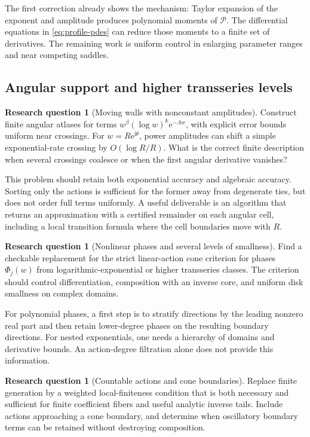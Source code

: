 \documentclass[11pt,a4paper]{article}
\numberwithin{equation}{section}
\theoremstyle{definition}
\newtheorem{question}[theorem]{Research question}
\theoremstyle{remark}
\newcommand{\ii}{\mathrm i}
\newcommand{\e}{\mathrm e}
\begin{document}
The first correction already shows the mechanism: Taylor expansion
of the exponent and amplitude produces polynomial moments of
$\mathcal P$. The differential equations in
\eqref{eq:profile-pdes} can reduce those moments to a finite set of
derivatives. The remaining work is uniform control in enlarging
parameter ranges and near competing saddles.

\subsection{Angular support and higher transseries levels}

\begin{question}[Moving walls with nonconstant amplitudes]
Construct finite angular atlases for terms
$w^\beta(\log w)^k\e^{-\Lambda w}$, with explicit error bounds
uniform near crossings. For $w=R\e^{\ii\theta}$, power amplitudes
can shift a simple exponential-rate crossing by
$O(\log R/R)$.
What is the correct finite description when several crossings
coalesce or when the first angular derivative vanishes?
\end{question}

This problem should retain both exponential accuracy and algebraic
accuracy. Sorting only the actions is sufficient for the former
away from degenerate ties, but does not order full terms uniformly.
A useful deliverable is an algorithm that returns an approximation
with a certified remainder on each angular cell, including a local
transition formula where the cell boundaries move with $R$.

\begin{question}[Nonlinear phases and several levels of smallness]
Find a checkable replacement for the strict linear-action cone
criterion for phases $\Phi_j(w)$ from logarithmic-exponential
or higher transseries classes.
The criterion should control differentiation, composition with
an inverse core, and uniform disk smallness on complex domains.
\end{question}

For polynomial phases, a first step is to stratify directions by
the leading nonzero real part and then retain lower-degree phases
on the resulting boundary directions. For nested exponentials,
one needs a hierarchy of domains and derivative bounds.
An action-degree filtration alone does not provide this information.

\begin{question}[Countable actions and cone boundaries]
Replace finite generation by a weighted local-finiteness condition
that is both necessary and sufficient for finite coefficient fibers
and useful analytic inverse tails. Include actions approaching a
cone boundary, and determine when oscillatory boundary terms can
be retained without destroying composition.
\end{question}
\end{document}

